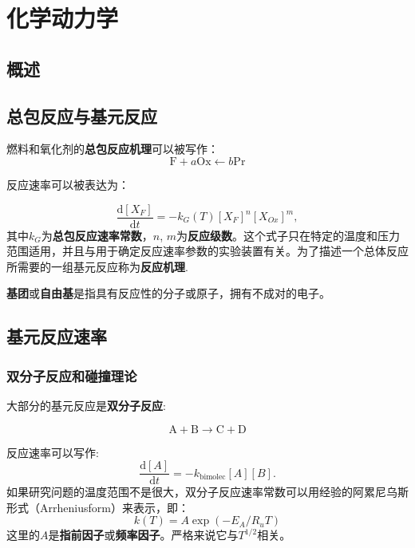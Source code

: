 \section{化学动力学}
\subsection{概述}
\subsection{总包反应与基元反应}
燃料和氧化剂的\textbf{总包反应机理}可以被写作：
\begin{equation}
    \mathrm{F} + a\mathrm{Ox}\leftarrow b\mathrm{Pr}
\end{equation}

反应速率可以被表达为：

\begin{equation}
    {\frac{\mathrm{d}[X_{F}]}{\mathrm{d}t}}=-k_{G}(T)[X_{F}]^{n}[X_{O x}]^{m},
\end{equation}其中\(k_G\)为\textbf{总包反应速率常数}，\(n\), \(m\)为\textbf{反应级数}。这个式子只在特定的温度和压力范围适用，并且与用于确定反应速率参数的实验装置有关。为了描述一个总体反应所需要的一组基元反应称为\textbf{反应机理}.

\textbf{基团}或\textbf{自由基}是指具有反应性的分子或原子，拥有不成对的电子。

\subsection{基元反应速率}
\subsubsection{双分子反应和碰撞理论}
大部分的基元反应是\textbf{双分子反应}:

\begin{equation}
    \mathrm{A}+\mathrm{B}\rightarrow \mathrm{C} + \mathrm{D}
\end{equation}

反应速率可以写作:
\begin{equation}
    {\frac{\mathrm{d}[{A}]}{\mathrm{d}t}}=-k_{\mathrm{bimolec}}[{A}][{B}].
\end{equation}
如果研究问题的温度范围不是很大，双分子反应速率常数可以用经验的阿累尼乌斯形式（Arrheniusform）来表示，即：
\begin{equation}
    k(T) = A\exp(-E_A/R_u T)
\end{equation}这里的\(A\)是\textbf{指前因子}或\textbf{频率因子}。严格来说它与\(T^{1/2}\)相关。

